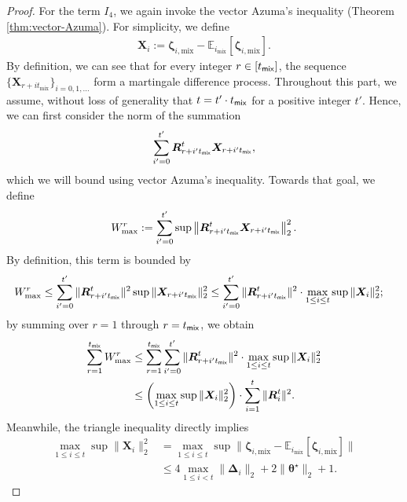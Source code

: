 \begin{proof}
For the term $I_4$, we again invoke the vector Azuma's inequality (Theorem \ref{thm:vector-Azuma}). %
For simplicity, we define
\begin{align}
	\bm{X}_i := \bm{\zeta}_{i,\text{mix}}-\mathbb{E}_{i_{\text{mix}}}[\bm{\zeta}_{i,\text{mix}}].
\end{align}
By definition, we can see that for every integer $r \in [t_{\mathsf{mix}}]$, the sequence $\{ \bm{X}_{r + i t_{\text{mix}}} \}_{i=0,1,\ldots}$
form a martingale difference process. Throughout this part, we assume, without loss of generality that $t = t' \cdot t_{\mathsf{mix}}$ for a positive integer $t'$. Hence, we can first consider the norm of the summation
\begin{align}
\sum_{i'=0}^{t'} \bm{R}_{r+i't_{\mathsf{mix}}}^t \bm{X}_{r+i't_{\mathsf{mix}}},
\end{align}
which we will bound using vector Azuma's inequality. Towards that goal, we define 
\begin{align*}
W_{\max}^r :=  \sum_{i'=0}^{t'} \sup\left\|\bm{R}_{r+i't_{\mathsf{mix}}}^t \bm{X}_{r+i't_{\mathsf{mix}}}\right\|_2^2.
\end{align*}
By definition, this term is bounded by
\begin{align*}
W_{\max}^r &\leq \sum_{i'=0}^{t'}\|\bm{R}_{r+i't_{\mathsf{mix}}}^t\|^2 \sup \|\bm{X}_{r+i't_{\mathsf{mix}}}\|_2^2 \leq  \sum_{i'=0}^{t'}\|\bm{R}_{r+i't_{\mathsf{mix}}}^t\|^2 \cdot \max_{1 \leq i \leq t} \sup \|\bm{X}_i\|_2^2;
\end{align*}
by summing over $r = 1$ through $r = t_{\mathsf{mix}}$, we obtain
\begin{align*}
\sum_{r=1}^{t_{\mathsf{mix}}} W_{\max}^r &\leq \sum_{r=1}^{t_{\mathsf{mix}}} \sum_{i'=0}^{t'}\|\bm{R}_{r+i't_{\mathsf{mix}}}^t\|^2 \cdot  \max_{1 \leq i \leq t} \sup \|\bm{X}_i\|_2^2 \\ 
&\leq  \left(\max_{1 \leq i \leq t} \sup \|\bm{X}_i\|_2^2\right)\cdot \sum_{i=1}^t \|\bm{R}_i^t\|^2 .
\end{align*}
Meanwhile, the triangle inequality directly implies
\begin{align*}
\max_{1 \leq i \leq t} \sup \|\bm{X}_i\|_2^2 &= \max_{1 \leq i \leq t} \sup \|\bm{\zeta}_{i,\text{mix}}-\mathbb{E}_{i_{\text{mix}}}[\bm{\zeta}_{i,\text{mix}}]\| \\ 
&\leq 4\max_{1 \leq i < t} \|\bm{\Delta}_i\|_2 + 2\|\bm{\theta}^\star\|_2  + 1.

\end{align*}
\end{proof}
